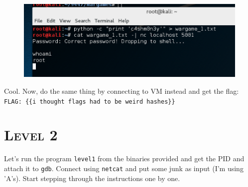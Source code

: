 \documentclass[12pt, bibliography=totocnumbered]{article}
\newcommand{\ssection}[1]{%
  \section[#1]{\centering\normalfont\scshape #1}}
\begin{document}
\begin{figure}[H]
\centerline{\includegraphics[width=1\textwidth]{img/1/2.png}}
\end{figure}
Cool. Now, do the same thing by connecting to VM instead and get the flag:
\newline
\texttt{FLAG: \{\{i thought flags had to be weird hashes\}\}}
\newpage
\ssection{\textbf{Level 2}}
Let's run the program \texttt{level1} from the binaries provided and get the PID and attach it to \texttt{gdb}. Connect using \texttt{netcat} and put some junk as input (I'm using 'A's). 
Start stepping through the instructions one by one.
\end{document}
